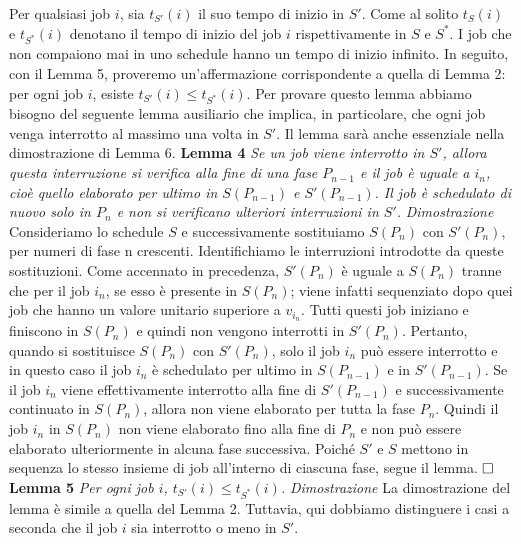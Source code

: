\documentclass[12pt]{article}
\begin{document}
Per qualsiasi job $i$, sia $t_{S'}(i)$ il suo tempo di inizio in $S'$. Come al solito $t_{S}(i)$ e $t_{S^{*}}(i)$ denotano il tempo di inizio del job $i$ rispettivamente in $S$ e $S^{*}$. I job che non compaiono mai in uno schedule hanno un tempo di inizio infinito. In seguito, con il Lemma 5, proveremo un'affermazione corrispondente a quella di Lemma 2: per ogni job $i$, esiste $t_{S'}(i) \leq  t_{S^{*}}(i)$. Per provare questo lemma abbiamo bisogno del seguente lemma ausiliario che implica, in particolare, che ogni job venga interrotto al massimo una volta in $S'$. Il lemma sarà anche essenziale nella dimostrazione di Lemma 6.
\newline\newline
\textbf{Lemma 4}
\textit{Se un job viene interrotto in $S'$, allora questa interruzione si verifica alla fine di una fase $P_{n-1}$ e il job è uguale a $i_{n}$, cioè quello elaborato per ultimo in $S(P_{n-1})$ e $S'(P_{n-1})$. Il job è schedulato di nuovo solo in $P_{n}$ e non si verificano ulteriori interruzioni in $S'$.}
\newline\newline
\textit{Dimostrazione}
Consideriamo lo schedule $S$ e successivamente sostituiamo $S(P_{n})$ con $S'(P_{n})$, per numeri di fase n crescenti. Identifichiamo le interruzioni introdotte da queste sostituzioni. Come accennato in precedenza, $S'(P_{n})$ è uguale a $S(P_{n})$ tranne che per il job $i_{n}$, se esso è presente in $S(P_{n})$; viene infatti sequenziato dopo quei job che hanno un valore unitario superiore a $v_{i_{n}}$. Tutti questi job iniziano e finiscono in $S(P_{n})$ e quindi non vengono interrotti in $S'(P_{n})$. Pertanto, quando si sostituisce $S(P_{n})$ con $S'(P_{n})$, solo il job $i_{n}$ può essere interrotto e in questo caso il job $i_{n}$ è schedulato per ultimo in $S(P_{n-1})$ e in $S'(P_{n-1})$. Se il job $i_{n}$ viene effettivamente interrotto alla fine di $S'(P_{n-1})$ e successivamente continuato in $S(P_{n})$, allora non viene elaborato per tutta la fase $P_{n}$. Quindi il job $i_{n}$ in $S(P_{n})$ non viene elaborato fino alla fine di $P_{n}$ e non può essere elaborato ulteriormente in alcuna fase successiva. Poiché $S'$ e $S$ mettono in sequenza lo stesso insieme di job all'interno di ciascuna fase, segue il lemma. $\hfill \square$
\newline \newline
\textbf{Lemma 5}
\textit{Per ogni job $i$, $t_{S'}(i) \leq t_{S^{*}}(i)$.}
\newline \newline
\textit{Dimostrazione}
La dimostrazione del lemma è simile a quella del Lemma 2. Tuttavia, qui dobbiamo distinguere i casi a seconda che il job $i$ sia interrotto o meno in $S'$. 
\end{document}
